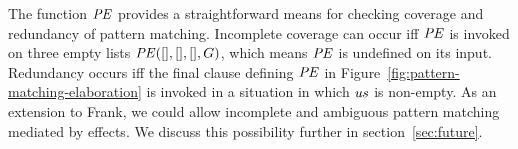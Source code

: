 \documentclass[12pt]{article}
\begin{document}
The function $\mathit{PE}$ provides a straightforward means for checking
coverage and redundancy of pattern matching. Incomplete coverage can
occur iff $\mathit{PE}$ is invoked on three empty lists $\mathit{PE}([],
[], [], G)$, which means $\mathit{PE}$ is undefined on its
input. Redundancy occurs iff the final clause defining $\mathit{PE}$ in
Figure~\ref{fig:pattern-matching-elaboration} is invoked in a
situation in which $\mathit{us}$ is non-empty.
%
As an extension to Frank, we could allow incomplete and ambiguous
pattern matching mediated by effects.
We discuss this possibility further in
section~\ref{sec:future}.

\end{document}
